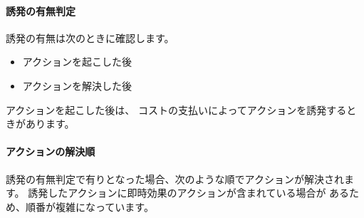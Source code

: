 \documentclass[letterpaper,10pt,dvipdfmx]{sphinxmanual}
\begin{document}
\paragraph{誘発の有無判定}
\label{\detokenize{common/05-action_detail:id9}}
誘発の有無は次のときに確認します。
\begin{itemize}
\item {} 
アクションを起こした後

\item {} 
アクションを解決した後

\end{itemize}

アクションを起こした後は、
コストの支払いによってアクションを誘発するときがあります。


\paragraph{アクションの解決順}
\label{\detokenize{common/05-action_detail:action-resolves}}\label{\detokenize{common/05-action_detail:id10}}
誘発の有無判定で有りとなった場合、次のような順でアクションが解決されます。
誘発したアクションに即時効果のアクションが含まれている場合が
あるため、順番が複雑になっています。
\end{document}
